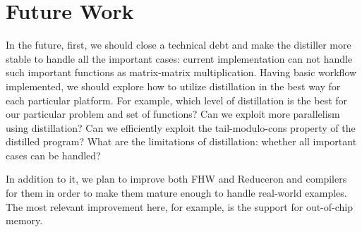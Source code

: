 \section{Future Work}


In the future, first, we should close a technical debt and make the distiller more stable to handle all the important cases: current implementation can not handle such important functions as matrix-matrix multiplication.
Having basic workflow implemented, we should explore how to utilize distillation in the best way for each particular platform. 
For example, which level of distillation is the best for our particular problem and set of functions?
Can we exploit more parallelism using distillation?
Can we efficiently exploit the tail-modulo-cons property of the distilled program?
What are the limitations of distillation: whether all important cases can be handled?


In addition to it, we plan to improve both FHW
and Reduceron
and compilers for them in order to make them mature enough to handle real-world examples.
The most relevant improvement here, for example, is the support for out-of-chip memory.

